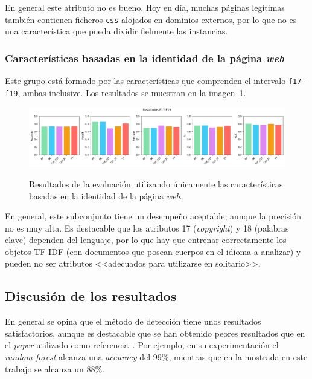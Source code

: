 En general este atributo no es bueno. Hoy en día, muchas páginas legítimas también contienen ficheros \texttt{css} alojados en dominios externos, por lo que no es una característica que pueda dividir fielmente las instancias.

\subsubsection{Características basadas en la identidad de la página \textit{web}}
Este grupo está formado por las características que comprenden el intervalo \texttt{f17-f19}, ambas inclusive. Los resultados se muestran en la imagen~\ref{gr:ph-f17f19_small}.

\begin{figure}[h]
	\caption[\textit{Phishing}: detección (\texttt{f17-f19})]{Resultados de la evaluación utilizando únicamente las características basadas en la identidad de la página \textit{web}.}
	\centering
	\includegraphics[width=\textwidth]{../img/memoria/5_phishing/f17f19_small}
	\label{gr:ph-f17f19_small}
\end{figure}

En general, este subconjunto tiene un desempeño aceptable, aunque la precisión no es muy alta. Es destacable que los atributos 17 (\textit{copyright}) y 18 (palabras clave) dependen del lenguaje, por lo que hay que entrenar correctamente los objetos TF-IDF (con documentos que posean cuerpos en el idioma a analizar) y pueden no ser atributos <<adecuados para utilizarse en solitario>>.


\subsection{Discusión de los resultados}

En general se opina que el método de detección tiene unos resultados satisfactorios, aunque es destacable que se han obtenido peores resultados que en el \textit{paper} utilizado como referencia~\cite{featuresPhishing2018Gupta}. Por ejemplo, en su experimentación el \textit{random forest} alcanza una \textit{accuracy} del 99\%, mientras que en la mostrada en este trabajo se alcanza un 88\%.

